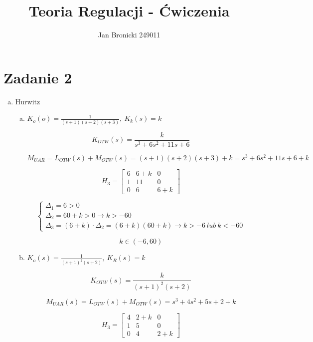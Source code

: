 \documentclass{article}
\title{Teoria Regulacji - Ćwiczenia}
\author{Jan Bronicki 249011}
\date{}
\begin{document}
\maketitle


\section*{Zadanie 2}
\begin{enumerate}[a)]
    \item Hurwitz 
    \begin{enumerate}[a)]
        \item $K_{o}\left(o\right)=\frac{1}{\left(s+1\right)\left(s+2\right)\left(s+3\right)}
        , \ K_{k}\left(s\right)=k$
        
        $$K_{OTW}\left(s\right)=\frac{k}{s^{3}+6s^{2}+11s+6}$$
        
        $$ M_{UAR}=L_{OTW}\left(s\right)+M_{OTW}\left(s\right)=
        \left(s+1\right)\left(s+2\right)\left(s+3\right)+k=s^{3}+6s^{2}+11s+6+k $$
        
        $$H_{3}=\left[\begin{matrix}
            6 & 6+k & 0   \\
            1 & 11  & 0   \\
            0 & 6   & 6+k
        \end{matrix}\right]$$
        
        \[\begin{cases}
            \Delta_{1}=6>0
            \\
            \Delta_{2}=60+k>0 \rightarrow k>-60
            \\
            \Delta_{3}=\left(6+k\right)\cdot \Delta_{2}=\left(6+k\right) \left(60+k\right) \rightarrow k>-6 \ lub \ k<-60
        \end{cases}\]
        
        $$k \in \left(-6, 60\right)$$
        
        \item $K_{o}\left(s\right)=\frac{1}{\left(s+1\right)^{2}\left(s+2\right)}, \ K_{R}\left(s\right)=k$
        
        $$ K_{OTW}\left(s\right)=\frac{k}{\left(s+1\right)^{2}\left(s+2\right)}$$
        
        $$M_{UAR}\left(s\right)=L_{OTW}\left(s\right)+M_{OTW}\left(s\right)=s^{3}+4s^{2}+5s+2+k $$
        
        
        $$H_{3}=\left[\begin{matrix}
            4 & 2+k & 0   \\
            1 & 5  & 0   \\
            0 & 4   & 2+k
        \end{matrix}\right]$$
        

\end{enumerate}
\end{enumerate}
\end{document}
